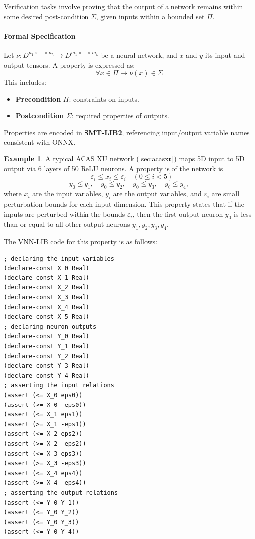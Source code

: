 \documentclass[oneside,11pt,dvipsnames]{book}
\numberwithin{equation}{section}
\theoremstyle{definition}
\newtheorem{example}{Example}[section]
\theoremstyle{remark}
\newcommand{\tvn}[1]{\iftoggle{usecomment}{{\color{red}{[TVN]: #1}}}{}}
\newcommand{\hd}[1]{\iftoggle{usecomment}{{\color{blue}{[HD]: #1}}}{}}
\begin{document}
Verification tasks involve proving that the output of a network remains within some desired post-condition $\Sigma$, given inputs within a bounded set $\Pi$.

\paragraph{Formal Specification}
Let $\nu: D^{n_1 \times \dots \times n_h} \to D^{m_1 \times \dots \times m_k}$ be a neural network, and $x$ and $y$ its input and output tensors. A property is expressed as:
\[
\forall x \in \Pi \rightarrow \nu(x) \in \Sigma
\]
This includes:
\begin{itemize}
    \item \textbf{Precondition} $\Pi$: constraints on inputs.
    \item \textbf{Postcondition} $\Sigma$: required properties of outputs.
\end{itemize}

Properties are encoded in \textbf{SMT-LIB2}, referencing input/output variable names consistent with ONNX.


\begin{example}
A typical ACAS XU network (\autoref{sec:acasxu}) maps 5D input to 5D output via 6 layers of 50 ReLU neurons. A property is of the network is
\[
-\varepsilon_i \leq x_i \leq \varepsilon_i \quad (0 \leq i < 5)
\]
\[
y_0 \leq y_1, \quad y_0 \leq y_2, \quad y_0 \leq y_3, \quad y_0 \leq y_4,
\]
where $x_i$ are the input variables, $y_i$ are the output variables, and $\varepsilon_i$ are small perturbation bounds for each input dimension. This property states that if the inputs are perturbed within the bounds $\varepsilon_i$, then the first output neuron $y_0$ is less than or equal to all other output neurons $y_1, y_2, y_3, y_4$.


The VNN-LIB code for this property is as follows:

\begin{lstlisting}[style=SMTLIB-style, language=SMTLIB,basicstyle=\ttfamily\scriptsize, multicols=2]
; declaring the input variables
(declare-const X_0 Real)
(declare-const X_1 Real)
(declare-const X_2 Real)
(declare-const X_3 Real)
(declare-const X_4 Real)
(declare-const X_5 Real)
; declaring neuron outputs
(declare-const Y_0 Real)
(declare-const Y_1 Real)
(declare-const Y_2 Real)
(declare-const Y_3 Real)
(declare-const Y_4 Real)
; asserting the input relations
(assert (<= X_0 eps0))
(assert (>= X_0 -eps0))
(assert (<= X_1 eps1))
(assert (>= X_1 -eps1))
(assert (<= X_2 eps2))
(assert (>= X_2 -eps2))
(assert (<= X_3 eps3))
(assert (>= X_3 -eps3))
(assert (<= X_4 eps4))
(assert (>= X_4 -eps4))
; asserting the output relations
(assert (<= Y_0 Y_1))
(assert (<= Y_0 Y_2))
(assert (<= Y_0 Y_3))
(assert (<= Y_0 Y_4))
\end{lstlisting}
\end{example}
\end{document}
